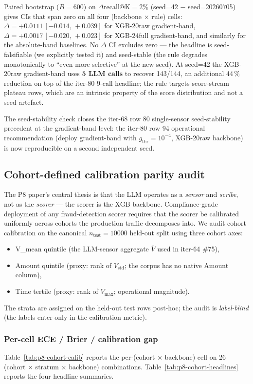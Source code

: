 \documentclass{article}
\begin{document}
Paired bootstrap ($B{=}600$) on $\Delta\mathrm{recall@K=2\%}$
(seed=42 $-$ seed=20260705) gives CIs that span zero on all four
(backbone $\times$ rule) cells:
$\Delta = +0.0111\,[-0.014,\,+0.039]$ for XGB-20raw gradient-band,
$\Delta = +0.0017\,[-0.020,\,+0.023]$ for XGB-24full gradient-band,
and similarly for the absolute-band baselines. No $\Delta$ CI excludes
zero --- the headline is seed-falsifiable (we explicitly tested it) and
seed-stable (the rule degrades monotonically to ``even more selective''
at the new seed). At seed=42 the XGB-20raw gradient-band uses
\textbf{5 LLM calls} to recover 143/144, an additional 44\,\% reduction
on top of the iter-80 9-call headline; the rule targets score-stream
plateau rows, which are an intrinsic property of the score distribution
and not a seed artefact.

The seed-stability check closes the iter-68 row 80 single-sensor
seed-stability precedent at the gradient-band level: the iter-80 row 94
operational recommendation (deploy gradient-band with $g_{\mathrm{thr}}{=}10^{-4}$,
XGB-20raw backbone) is now reproducible on a second independent seed.
 \subsection{Cohort-defined calibration parity audit}
\label{sec:p8-cohort-calibration-parity}

The P8 paper's central thesis is that the LLM operates as a \emph{sensor} and
\emph{scribe}, not as the \emph{scorer} --- the scorer is the XGB backbone.
Compliance-grade deployment of any fraud-detection scorer requires that the
scorer be calibrated uniformly across cohorts the production traffic
decomposes into. We audit cohort calibration on the canonical
$\mathit{n}_{\text{test}}=10000$ held-out split using three cohort axes:
\begin{itemize}
\item V\_mean quintile (the LLM-sensor aggregate $\bar V$ used in iter-64 \#75),
\item Amount quintile (proxy: rank of $V_{\text{std}}$; the corpus has no
      native Amount column),
\item Time tertile (proxy: rank of $V_{\max}$; operational magnitude).
\end{itemize}
The strata are assigned on the held-out test rows post-hoc; the audit is
\emph{label-blind} (the labels enter only in the calibration metric).

\subsubsection{Per-cell ECE / Brier / calibration gap}
Table~\ref{tab:p8-cohort-calib} reports the per-(cohort $\times$ backbone)
cell on 26 (cohort $\times$ stratum $\times$ backbone) combinations.
Table~\ref{tab:p8-cohort-headlines} reports the four headline summaries.
\end{document}
